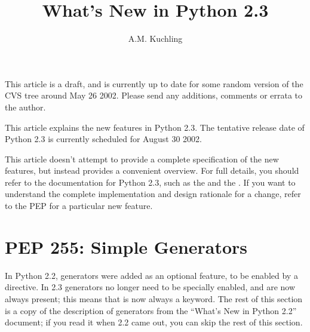 \documentclass{howto}
\title{What's New in Python 2.3}
\author{A.M. Kuchling}
\begin{document}
\maketitle
\tableofcontents

%
%
%
%
%


{\large This article is a draft, and is currently up to date for some
random version of the CVS tree around May 26 2002.  Please send any
additions, comments or errata to the author.}

This article explains the new features in Python 2.3.  The tentative
release date of Python 2.3 is currently scheduled for August 30 2002.

This article doesn't attempt to provide a complete specification of
the new features, but instead provides a convenient overview.  For
full details, you should refer to the documentation for Python 2.3,
such as the
 and the
.  If you want to understand the complete
implementation and design rationale for a change, refer to the PEP for
a particular new feature.


\section{PEP 255: Simple Generators\label{section-generators}}

In Python 2.2, generators were added as an optional feature, to be
enabled by a  directive.  In
2.3 generators no longer need to be specially enabled, and are now
always present; this means that  is now always a
keyword.  The rest of this section is a copy of the description of
generators from the ``What's New in Python 2.2'' document; if you read
it when 2.2 came out, you can skip the rest of this section.
\end{document}
